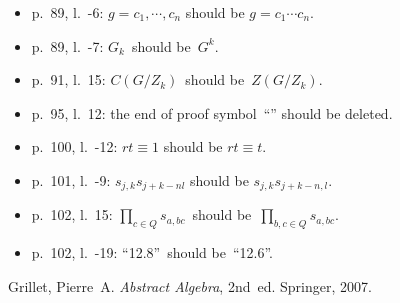 \documentclass[letterpaper,12pt]{article}
\begin{document}
\begin{itemize}
\item p.~89, l.~-6: \(g=c_1,\cdots,c_n\) should be \(g=c_1\cdots c_n\).
\item p.~89, l.~-7: \(G_k\)~should be~\(G^k\).
\item p.~91, l.~15: \(C(G/Z_k)\)~should be~\(Z(G/Z_k)\).
\item p.~95, l.~12: the end of proof symbol~``\qedsymbol'' should be deleted.
\item p.~100, l.~-12: \(rt\equiv 1\) should be \(rt\equiv t\).
\item p.~101, l.~-9: \(s_{j,k}s_{j+k-nl}\) should be \(s_{j,k}s_{j+k-n,l}\).
\item p.~102, l.~15: \(\prod_{c\in Q}s_{a,bc}\)~should be~\(\prod_{b,c\in Q}s_{a,bc}\).
\item p.~102, l.~-19: ``12.8''~should be~``12.6''.
\end{itemize}

\begin{thebibliography}{0}
 Grillet, Pierre~A. \textit{Abstract Algebra}, 2nd~ed. Springer, 2007.
\end{thebibliography}
\end{document}
